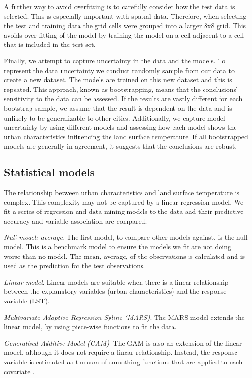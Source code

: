 \documentclass[final,3p,times,twocolumn,sort&compress]{elsarticle}
\begin{document}
A further way to avoid overfitting is to carefully consider how the test data is selected.
This is especially important with spatial data.
Therefore, when selecting the test and training data the grid cells were grouped into a larger 8x8 grid.
This avoids over fitting of the model by training the model on a cell adjacent to a cell that is included in the test set.

Finally, we attempt to capture uncertainty in the data and the models. 
To represent the data uncertainty we conduct randomly sample from our data to create a new dataset.
The models are trained on this new dataset and this is repeated.
This approach, known as bootstrapping, means that the conclusions' sensitivity to the data can be assessed.
If the results are vastly different for each bootstrap sample, we assume that the result is dependent on the data and is unlikely to be generalizable to other cities.
Additionally, we capture model uncertainty by using different models and assessing how each model shows the urban characteristics influencing the land surface temperature.
If all bootstrapped models are generally in agreement, it suggests that the conclusions are robust.

\subsection{Statistical models}
\label{ss:models}
The relationship between urban characteristics and land surface temperature is complex.
This complexity may not be captured by a linear regression model. 
We fit a series of regression and data-mining models to the data and their predictive accuracy and variable association are compared.

\textit{Null model: average}. The first model, to compare other models against, is the null model. 
This is a benchmark model to ensure the models we fit are not doing worse than no model.
The mean, average, of the observations is calculated and is used as the prediction for the test observations.

\textit{Linear model}. Linear models are suitable when there is a linear relationship between the explanatory variables (urban characteristics) and the response variable (LST).

\textit{Multivariate Adaptive Regression Spline (MARS)}. The MARS model extends the linear model, by using piece-wise functions to fit the data. \cite{Friedman1991-of}

\textit{Generalized Additive Model (GAM)}. The GAM is also an extension of the linear model, although it does not require a linear relationship. Instead, the response variable is estimated as the sum of smoothing functions that are applied to each covariate \cite{Hastie1990-cg}.
\end{document}
